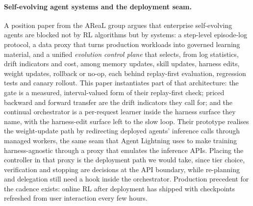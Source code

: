 \documentclass[10pt]{article}
\begin{document}
\paragraph{Self-evolving agent systems and the deployment seam.} A position paper from the AReaL group \citep{areal2} argues that enterprise self-evolving agents are blocked not by RL algorithms but by systems: a step-level episode-log protocol, a data proxy that turns production workloads into governed learning material, and a unified \emph{evolution control plane} that selects, from log statistics, drift indicators and cost, among memory updates, skill updates, harness edits, weight updates, rollback or no-op, each behind replay-first evaluation, regression tests and canary rollout. This paper instantiates part of that architecture: the gate is a measured, interval-valued form of their replay-first check; priced backward and forward transfer are the drift indicators they call for; and the continual orchestrator is a per-request learner inside the harness surface they name, with the harness-edit surface left to the slow loop. Their prototype realises the weight-update path by redirecting deployed agents' inference calls through managed workers, the same seam that Agent Lightning \citep{agentlightning} uses to make training harness-agnostic through a proxy that emulates the inference APIs. Placing the controller in that proxy is the deployment path we would take, since tier choice, verification and stopping are decisions at the API boundary, while re-planning and delegation still need a hook inside the orchestrator. Production precedent for the cadence exists: online RL after deployment has shipped with checkpoints refreshed from user interaction every few hours.
\end{document}
